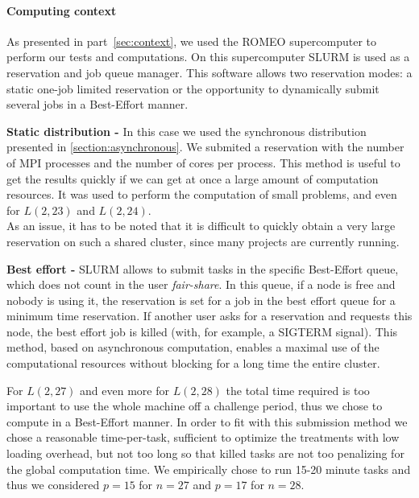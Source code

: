 \paragraph{Computing context}

As presented in part~\ref{sec:context}, we used the ROMEO supercomputer to perform our tests and computations.
On this supercomputer SLURM\cite{slurm} is used as a reservation and job queue manager.
This software allows two reservation modes: a static one-job limited reservation or the opportunity to dynamically submit several jobs in a Best-Effort manner.

\textbf{Static distribution -}
In this case we used the synchronous distribution presented in \ref{section:asynchronous}. 
We submited a reservation with the number of MPI processes and the number of cores per process.
This method is useful to get the results quickly if we can get at once a large amount of computation resources. It was used to perform the computation of small problems, and even for $L(2,23)$ and $L(2,24)$.\\
As an issue, it has to be noted that it is difficult to quickly obtain a very large reservation on such a shared cluster, since many projects are currently running. 

\textbf{Best effort -}
SLURM allows to submit tasks in the specific Best-Effort queue, which does not count in the user \textit{fair-share}. In this queue, if a node is free and nobody is using it, the reservation is set for a job in the best effort queue for a minimum time reservation. 
If another user asks for a reservation and requests this node, the best effort job is killed (with, for example, a SIGTERM signal). This method, based on asynchronous computation, enables a maximal use of the computational resources without blocking for a long time the entire cluster.

For $L(2,27)$ and even more for $L(2,28)$ the total time required is too important to use the whole machine off a challenge period, thus we chose to compute in a Best-Effort manner.
In order to fit with this submission method we chose a reasonable time-per-task, sufficient to optimize the treatments with low loading overhead, but not too long so that killed tasks are not too penalizing for the global computation time. We empirically chose to run 15-20 minute tasks and thus we considered $p=15$ for $n=27$ and $p=17$ for $n=28$. 

